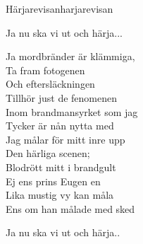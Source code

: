 \begin{song}{Härjarevisan}{harjarevisan}
\begin{vers}
Ja nu ska vi ut och härja... \\
\end{vers}
\begin{vers}
Ja mordbränder är klämmiga, \\
Ta fram fotogenen\\
Och eftersläckningen\\
Tillhör just de fenomenen\\
Inom brandmansyrket som jag\\
Tycker är nån nytta med\\
Jag målar för mitt inre upp\\
Den härliga scenen;\\
Blodrött mitt i brandgult\\
Ej ens prins Eugen en\\
Lika mustig vy kan måla\\
Ens om han målade med sked\\
\end{vers}
\begin{vers}
Ja nu ska vi ut och härja..\\
\end{vers}
\end{song}
